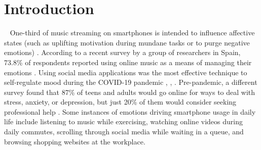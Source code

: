 \section{Introduction}~\label{sec:introduction}
{O}{ne}-third of music streaming on smartphones is intended to influence affective states (such as uplifting motivation during mundane tasks or to purge negative emotions) \cite{wadley2019use}. According to a recent survey by a group of researchers in Spain, 73.8\% of respondents reported using online music as a means of managing their emotions \cite{martin2021music}. Using social media applications was the most effective technique to self-regulate mood during the COVID-19 pandemic \cite{prikhidko2020effect}, \cite{shao2021social}, \cite{colasante2020any}. Pre-pandemic, a different survey found that 87\% of teens and adults would go online for ways to deal with stress, anxiety, or depression, but just 20\% of them would consider seeking professional help \cite{rideout2018digital}. Some instances of emotions driving smartphone usage in daily life include listening to music while exercising, watching online videos during daily commutes, scrolling through social media while waiting in a queue, and browsing shopping websites at the workplace.
    
